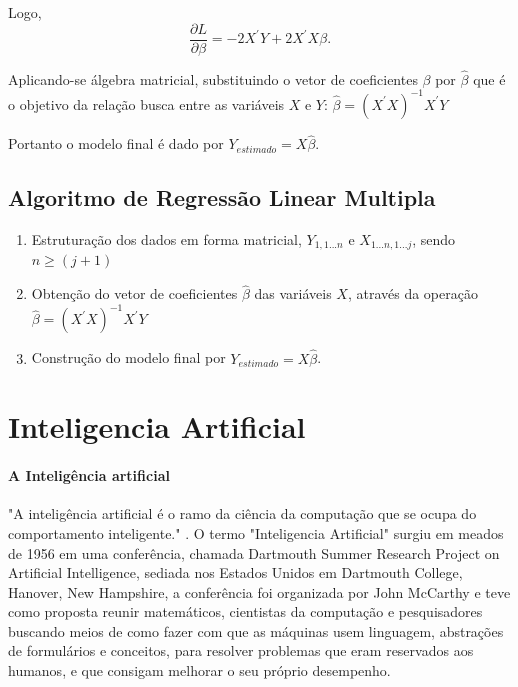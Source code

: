 \documentclass[	12pt, Times, openright, twoside, a4paper, english, brazil]{abntex2}
\begin{document}
          Logo, $$\frac{\partial L}{\partial\beta}=-2X^\prime Y+2X^\prime X\beta.$$
          
          Aplicando-se álgebra matricial, substituindo o vetor de coeficientes $\beta$ por $\widehat\beta$ que é o objetivo da relação busca entre as variáveis $X$ e $Y$:
          $\widehat{\beta}=(X^\prime X)^{-1} X^\prime Y$
          
          Portanto o modelo final é dado por $Y_{estimado} = X\widehat{\beta}$.
          
        \subsection{Algoritmo de Regressão Linear Multipla}
        
            \begin{enumerate}
                  \item Estruturação dos dados em forma matricial, $Y_{1,1...n}$ e $X_{1...n,1...j}$, sendo $n \geq (j+1)$ \\
                  \item Obtenção do vetor de coeficientes $\widehat{\beta}$ das variáveis $X$, através da operação $\widehat{\beta}=(X^\prime X)^{-1} X^\prime Y$
                  \item Construção do modelo final por $Y_{estimado} = X\widehat{\beta}$.
            \end{enumerate}
      \section{Inteligencia Artificial}
        \paragraph*{A Inteligência artificial} "A inteligência artificial é o ramo da ciência da computação que se ocupa do comportamento inteligente." \cite{Luger2004}.
          O termo "Inteligencia Artificial" surgiu em meados de 1956 em uma conferência, chamada Dartmouth Summer Research Project on Artificial Intelligence, sediada nos Estados Unidos em Dartmouth College, Hanover, New Hampshire, a conferência foi organizada por John McCarthy e teve como proposta reunir matemáticos, cientistas da computação e pesquisadores buscando meios de como fazer com que as máquinas usem linguagem, abstrações de formulários e conceitos, para resolver problemas que eram reservados aos humanos, e que consigam melhorar o seu próprio desempenho.
\end{document}
